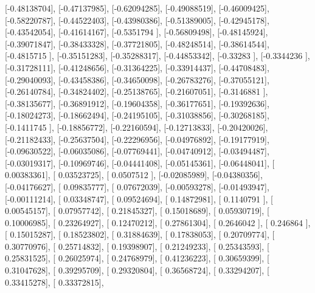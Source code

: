 \documentclass{article}
\begin{document}
       [-0.48138704],
       [-0.47137985],
       [-0.62094285],
       [-0.49088519],
       [-0.46009425],
       [-0.58220787],
       [-0.44522403],
       [-0.43980386],
       [-0.51389005],
       [-0.42945178],
       [-0.43542054],
       [-0.41614167],
       [-0.5351794 ],
       [-0.56809498],
       [-0.48145924],
       [-0.39071847],
       [-0.38433328],
       [-0.37721805],
       [-0.48248514],
       [-0.38614544],
       [-0.4815715 ],
       [-0.35151283],
       [-0.35288317],
       [-0.44853342],
       [-0.33283   ],
       [-0.3344236 ],
       [-0.31728111],
       [-0.41248656],
       [-0.31364225],
       [-0.33914437],
       [-0.44708483],
       [-0.29040093],
       [-0.43458386],
       [-0.34650098],
       [-0.26783276],
       [-0.37055121],
       [-0.26140784],
       [-0.34824402],
       [-0.25138765],
       [-0.21607051],
       [-0.3146881 ],
       [-0.38135677],
       [-0.36891912],
       [-0.19604358],
       [-0.36177651],
       [-0.19392636],
       [-0.18024273],
       [-0.18662494],
       [-0.24195105],
       [-0.31038856],
       [-0.30268185],
       [-0.1411745 ],
       [-0.18856772],
       [-0.22160594],
       [-0.12713833],
       [-0.20420026],
       [-0.21182433],
       [-0.25637504],
       [-0.22296956],
       [-0.04976892],
       [-0.19177919],
       [-0.09630522],
       [-0.06035086],
       [-0.07769441],
       [-0.04740912],
       [-0.03494487],
       [-0.03019317],
       [-0.10969746],
       [-0.04441408],
       [-0.05145361],
       [-0.06448041],
       [ 0.00383361],
       [ 0.03523725],
       [ 0.0507512 ],
       [-0.02085989],
       [-0.04380356],
       [-0.04176627],
       [ 0.09835777],
       [ 0.07672039],
       [-0.00593278],
       [-0.01493947],
       [-0.00111214],
       [ 0.03348747],
       [ 0.09524694],
       [ 0.14872981],
       [ 0.1140791 ],
       [ 0.00545157],
       [ 0.07957742],
       [ 0.21845327],
       [ 0.15018689],
       [ 0.05930719],
       [ 0.10006985],
       [ 0.23264927],
       [ 0.12470212],
       [ 0.27861304],
       [ 0.2646042 ],
       [ 0.246864  ],
       [ 0.15015287],
       [ 0.18523802],
       [ 0.31884639],
       [ 0.17838053],
       [ 0.20709774],
       [ 0.30770976],
       [ 0.25714832],
       [ 0.19398907],
       [ 0.21249233],
       [ 0.25343593],
       [ 0.25831525],
       [ 0.26025974],
       [ 0.24768979],
       [ 0.41236223],
       [ 0.30659399],
       [ 0.31047628],
       [ 0.39295709],
       [ 0.29320804],
       [ 0.36568724],
       [ 0.33294207],
       [ 0.33415278],
       [ 0.33372815],
\end{document}
